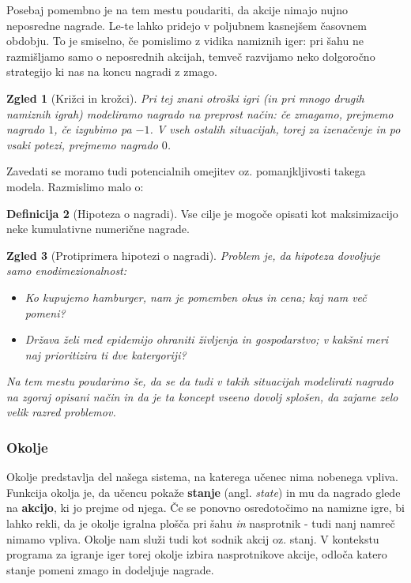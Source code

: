 \documentclass[12pt,a4paper]{amsart}
\theoremstyle{definition} %
\newtheorem{definicija}{Definicija}[section]
\theoremstyle{plain} %
\newtheorem{zgled}[definicija]{Zgled}
\begin{document}
Posebaj pomembno je na tem mestu poudariti, da akcije nimajo nujno neposredne nagrade. Le-te 
lahko pridejo v poljubnem kasnejšem časovnem obdobju. To je smiselno, če pomislimo z vidika 
namiznih iger: pri šahu ne razmišljamo samo o neposrednih akcijah, temveč razvijamo neko 
dolgoročno strategijo ki nas na koncu nagradi z zmago. 

\begin{zgled}[Križci in krožci]
    Pri tej znani otroški igri (in pri mnogo drugih namiznih igrah) modeliramo nagrado na 
    preprost način: če zmagamo, prejmemo nagrado $1$, če izgubimo pa $-1$. V vseh ostalih 
    situacijah, torej za izenačenje in po vsaki potezi, prejmemo nagrado $0$.
\end{zgled}

Zavedati se moramo tudi potencialnih omejitev oz. pomanjkljivosti takega modela. Razmislimo 
malo o:
\begin{definicija}[Hipoteza o nagradi]
    Vse cilje je mogoče opisati kot maksimizacijo neke kumulativne numerične 
    nagrade.
\end{definicija}

\begin{zgled}[Protiprimera hipotezi o nagradi]
    Problem je, da hipoteza dovoljuje samo enodimezionalnost:
    \begin{itemize}
        \item Ko kupujemo hamburger, nam je pomemben okus in cena; kaj nam več pomeni?
        \item Država želi med epidemijo ohraniti življenja in gospodarstvo; v kakšni 
                meri naj prioritizira ti dve katergoriji?
    \end{itemize}
    Na tem mestu poudarimo še, da se da tudi v takih situacijah modelirati nagrado na zgoraj 
    opisani način in da je ta koncept vseeno dovolj splošen, da zajame zelo velik razred problemov.
    
\end{zgled}

\subsubsection{Okolje}
Okolje predstavlja del našega sistema, na katerega učenec nima nobenega vpliva. Funkcija okolja
je, da učencu pokaže \textbf{stanje} (angl. \textit{state}) in mu da nagrado glede na 
\textbf{akcijo}, ki jo prejme od njega. Če se ponovno osredotočimo na namizne igre, bi lahko rekli, 
da je okolje igralna plošča pri šahu \textit{in} nasprotnik  - tudi nanj namreč nimamo vpliva. 
Okolje nam služi tudi kot sodnik akcij oz. stanj. V kontekstu programa za igranje iger torej 
okolje izbira nasprotnikove akcije, odloča katero stanje pomeni zmago in dodeljuje nagrade.
\end{document}
